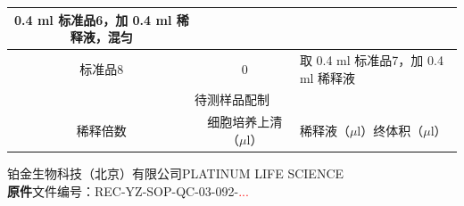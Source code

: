 \documentclass[UTF8,10pt,a4paper,fontset=fandol]{ctexart}
\newcommand{\fieldvalue}[1]{#1}
\newcommand{\handwritten}[1]{#1}
\begin{document}
\begin{tabularx}{\textwidth}{|c|c|X|}
\fieldvalue{\handwritten{0.4}}
ml 标准品6，加
\fieldvalue{\handwritten{0.4}}
ml 稀释液，混匀
\\ \hline
标准品8 & 0 &
取
\fieldvalue{\handwritten{0.4}}
ml 标准品7，加
\fieldvalue{\handwritten{0.4}}
ml 稀释液
\\ \hline
\multicolumn{3}{|c|}{待测样品配制}\\ \hline
稀释倍数 & 细胞培养上清（$\mu$l） & 稀释液（$\mu$l）\quad 终体积（$\mu$l） \\ \hline
\end{tabularx}


\newpage

\begin{center}
\small
铂金生物科技（北京）有限公司\qquad PLATINUM LIFE SCIENCE\\
\textbf{原件}\qquad 文件编号：REC-YZ-SOP-QC-03-092-\textcolor{red}{...}\\[2pt]
\end{center}
\end{document}
